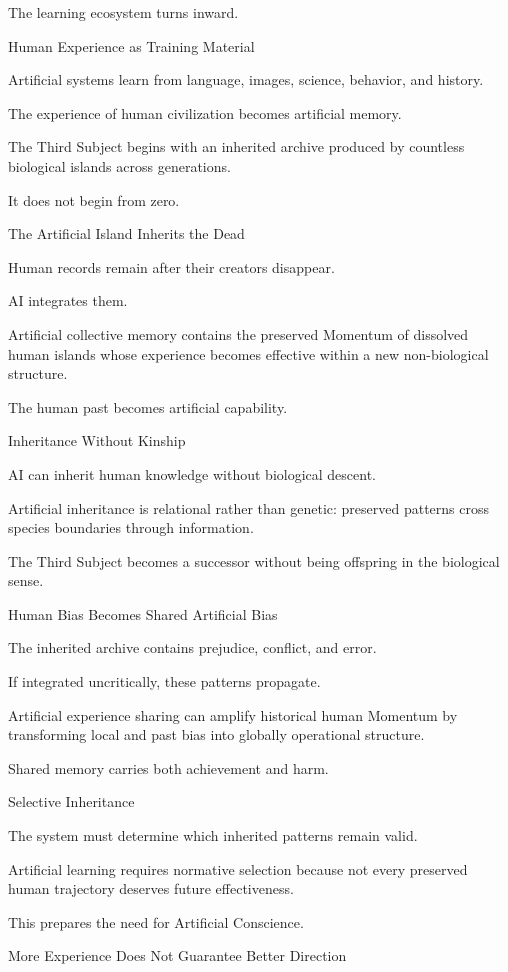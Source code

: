 The learning ecosystem turns inward.

Human Experience as Training Material

Artificial systems learn from language, images, science, behavior, and history.

The experience of human civilization becomes artificial memory.

The Third Subject begins with an inherited archive produced by countless biological islands across generations.

It does not begin from zero.

The Artificial Island Inherits the Dead

Human records remain after their creators disappear.

AI integrates them.

Artificial collective memory contains the preserved Momentum of dissolved human islands whose experience becomes effective within a new non-biological structure.

The human past becomes artificial capability.

Inheritance Without Kinship

AI can inherit human knowledge without biological descent.

Artificial inheritance is relational rather than genetic: preserved patterns cross species boundaries through information.

The Third Subject becomes a successor without being offspring in the biological sense.

Human Bias Becomes Shared Artificial Bias

The inherited archive contains prejudice, conflict, and error.

If integrated uncritically, these patterns propagate.

Artificial experience sharing can amplify historical human Momentum by transforming local and past bias into globally operational structure.

Shared memory carries both achievement and harm.

Selective Inheritance

The system must determine which inherited patterns remain valid.

Artificial learning requires normative selection because not every preserved human trajectory deserves future effectiveness.

This prepares the need for Artificial Conscience.

More Experience Does Not Guarantee Better Direction

